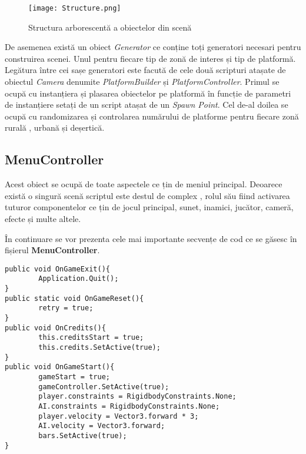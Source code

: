 \vspace{10mm}
\begin{figure}[H]
\centering
\texttt{[image: Structure.png]} \par
\caption{Structura arborescentă a obiectelor din scenă}
\end{figure}

De asemenea există un obiect \textit{Generator} ce conține toți generatori necesari pentru construirea scenei. Unul pentru fiecare tip de zonă de interes și tip de platformă. Legătura între cei sașe generatori este facută de cele două scripturi atașate de obiectul \textit{Camera} denumite \textit{PlatformBuilder} și \textit{PlatformController}. Primul se ocupă cu instanțiera și plasarea obiectelor pe platformă în funcție de parametri de instanțiere setați de un script atașat de un \textit{Spawn Point}. Cel de-al doilea se ocupă cu randomizarea și controlarea numărului de platforme pentru fiecare zonă rurală , urbană și deșertică.\par
\par

\subsection{MenuController}

Acest obiect se ocupă de toate aspectele ce țin de meniul principal. Deoarece există o singură scenă scriptul este destul de complex , rolul său fiind activarea tuturor componentelor ce țin de jocul principal, sunet, inamici, jucător, cameră, efecte și multe altele.\par

În continuare se vor prezenta cele mai importante secvențe de cod ce se găsesc în fișierul \textbf{MenuController}.\par

\begin{lstlisting}[caption=Funcțiile din MenuController]
public void OnGameExit(){
        Application.Quit();
}
public static void OnGameReset(){
        retry = true;
}
public void OnCredits(){
        this.creditsStart = true;
        this.credits.SetActive(true);
}
public void OnGameStart(){
        gameStart = true;
        gameController.SetActive(true);
        player.constraints = RigidbodyConstraints.None;
        AI.constraints = RigidbodyConstraints.None;
        player.velocity = Vector3.forward * 3;
        AI.velocity = Vector3.forward;
        bars.SetActive(true);
}
\end{lstlisting}

